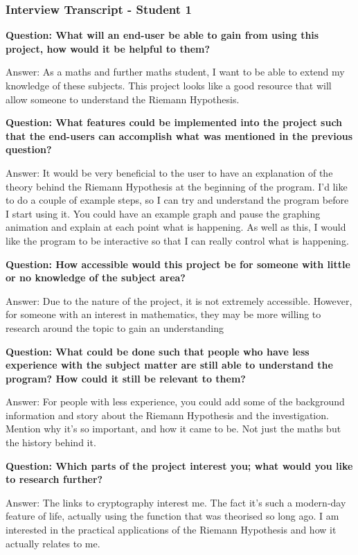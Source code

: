 \documentclass{article}
\begin{document}
\subsubsection{Interview Transcript - Student 1}

\textbf{Question: What will an end-user be able to gain from using this project, how would it be helpful to them?}

Answer: As a maths and further maths student, I want to be able to extend my knowledge of these subjects. This project looks like a good resource that will allow someone to understand the Riemann Hypothesis.

\textbf{Question: What features could be implemented into the project such that the end-users can accomplish what was mentioned in the previous question?}

Answer: It would be very beneficial to the user to have an explanation of the theory behind the Riemann Hypothesis at the beginning of the program. I'd like to do a couple of example steps, so I can try and understand the program before I start using it. You could have an example graph and pause the graphing animation and explain at each point what is happening. As well as this, I would like the program to be interactive so that I can really control what is happening.

\textbf{Question: How accessible would this project be for someone with little or no knowledge of the subject area?}

Answer: Due to the nature of the project, it is not extremely accessible. However, for someone with an interest in mathematics, they may be more willing to research around the topic to gain an understanding

\textbf{Question: What could be done such that people who have less experience with the subject matter are still able to understand the program? How could it still be relevant to them?}

Answer: For people with less experience, you could add some of the background information and story about the Riemann Hypothesis and the investigation. Mention why it's so important, and how it came to be. Not just the maths but the history behind it.

\textbf{Question: Which parts of the project interest you; what would you like to research further?}

Answer: The links to cryptography interest me. The fact it’s such a modern-day feature of life, actually using the function that was theorised so long ago. I am interested in the practical applications of the Riemann Hypothesis and how it actually relates to me.
\end{document}
